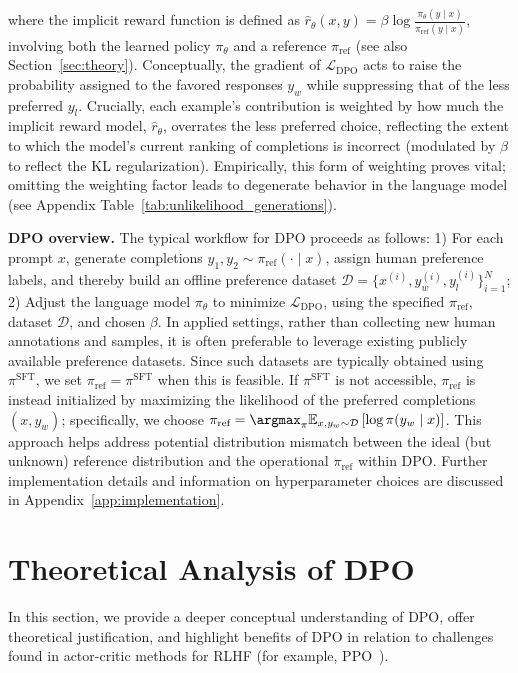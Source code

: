 where the implicit reward function is defined as $\hat{r}_\theta(x, y) = \beta \log \frac{\pi_\theta(y \mid x)}{\pi_\text{ref}(y \mid x)}$, involving both the learned policy $\pi_\theta$ and a reference $\pi_\text{ref}$ (see also Section~\ref{sec:theory}). Conceptually, the gradient of $\mathcal{L}_\text{DPO}$ acts to raise the probability assigned to the favored responses $y_w$ while suppressing that of the less preferred $y_l$. Crucially, each example’s contribution is weighted by how much the implicit reward model, $\hat{r}_\theta$, overrates the less preferred choice, reflecting the extent to which the model’s current ranking of completions is incorrect (modulated by $\beta$ to reflect the KL regularization). Empirically, this form of weighting proves vital; omitting the weighting factor leads to degenerate behavior in the language model (see Appendix Table~\ref{tab:unlikelihood_generations}).

\textbf{DPO overview.} The typical workflow for DPO proceeds as follows: 1) For each prompt $x$, generate completions $y_1, y_2 \sim \pi_\text{ref}(\cdot \mid x)$, assign human preference labels, and thereby build an offline preference dataset $\mathcal{D} = \{x^{(i)}, y_w^{(i)}, y_l^{(i)}\}_{i=1}^N$; 2) Adjust the language model $\pi_\theta$ to minimize $\mathcal{L}_\text{DPO}$, using the specified $\pi_\text{ref}$, dataset $\mathcal{D}$, and chosen $\beta$. 
In applied settings, rather than collecting new human annotations and samples, it is often preferable to leverage existing publicly available preference datasets. Since such datasets are typically obtained using $\pi^\text{SFT}$, we set $\pi_\text{ref} = \pi^\text{SFT}$ when this is feasible. If $\pi^\text{SFT}$ is not accessible, $\pi_\text{ref}$ is instead initialized by maximizing the likelihood of the preferred completions $(x, y_w)$; specifically, we choose ${\pi_\text{ref} = \argmax_{\pi}\mathbb{E}_{x, y_w \sim \mathcal{D}}\left[\log \pi(y_w \mid x)\right]}$. This approach helps address potential distribution mismatch between the ideal (but unknown) reference distribution and the operational $\pi_\text{ref}$ within DPO. Further implementation details and information on hyperparameter choices are discussed in Appendix~\ref{app:implementation}.

\section{Theoretical Analysis of DPO} In this section, we provide a deeper conceptual understanding of DPO, offer theoretical justification, and highlight benefits of DPO in relation to challenges found in actor-critic methods for RLHF (for example, PPO~\cite{schulman2017proximal}).

